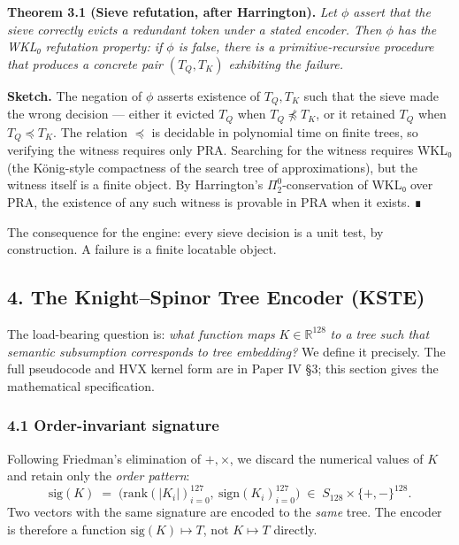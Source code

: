 \documentclass[
  11pt,
]{article}
\begin{document}
\textbf{Theorem 3.1 (Sieve refutation, after Harrington).} \emph{Let
\(\phi\) assert that the sieve correctly evicts a redundant token under
a stated encoder. Then \(\phi\) has the WKL₀ refutation property: if
\(\phi\) is false, there is a primitive-recursive procedure that
produces a concrete pair \((T_Q, T_K)\) exhibiting the failure.}

\textbf{Sketch.} The negation of \(\phi\) asserts existence of
\(T_Q, T_K\) such that the sieve made the wrong decision --- either it
evicted \(T_Q\) when \(T_Q \not\preceq T_K\), or it retained \(T_Q\)
when \(T_Q \preceq T_K\). The relation \(\preceq\) is decidable in
polynomial time on finite trees, so verifying the witness requires only
PRA. Searching for the witness requires WKL₀ (the König-style
compactness of the search tree of approximations), but the witness
itself is a finite object. By Harrington's \(\Pi_2^0\)-conservation of
WKL₀ over PRA, the existence of any such witness is provable in PRA when
it exists. ∎

The consequence for the engine: every sieve decision is a unit test, by
construction. A failure is a finite locatable object.

\hypertarget{the-knightspinor-tree-encoder-kste}{%
\subsection{4. The Knight--Spinor Tree Encoder
(KSTE)}\label{the-knightspinor-tree-encoder-kste}}

The load-bearing question is: \emph{what function maps}
\(K \in \mathbb{R}^{128}\) \emph{to a tree such that semantic
subsumption corresponds to tree embedding?} We define it precisely. The
full pseudocode and HVX kernel form are in Paper IV §3; this section
gives the mathematical specification.

\hypertarget{order-invariant-signature}{%
\subsubsection{4.1 Order-invariant
signature}\label{order-invariant-signature}}

Following Friedman's elimination of \(+, \times\), we discard the
numerical values of \(K\) and retain only the \emph{order pattern}:
\[\mathrm{sig}(K) \;=\; \bigl(\mathrm{rank}(|K_i|)_{i=0}^{127},\ \mathrm{sign}(K_i)_{i=0}^{127}\bigr) \;\in\; S_{128} \times \{+,-\}^{128}.\]
Two vectors with the same signature are encoded to the \emph{same} tree.
The encoder is therefore a function \(\mathrm{sig}(K) \mapsto T\), not
\(K \mapsto T\) directly.
\end{document}
